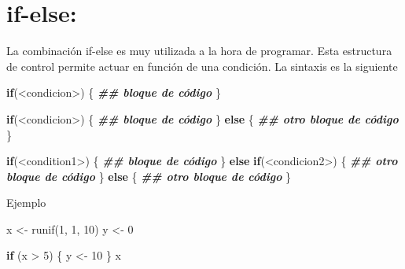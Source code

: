 \documentclass[
  12pt,
]{book}
\newenvironment{Shaded}{\begin{snugshade}}{\end{snugshade}}
\newcommand{\ControlFlowTok}[1]{\textcolor[rgb]{0.13,0.29,0.53}{\textbf{#1}}}
\newcommand{\DecValTok}[1]{\textcolor[rgb]{0.00,0.00,0.81}{#1}}
\newcommand{\DocumentationTok}[1]{\textcolor[rgb]{0.56,0.35,0.01}{\textbf{\textit{#1}}}}
\newcommand{\FunctionTok}[1]{\textcolor[rgb]{0.00,0.00,0.00}{#1}}
\newcommand{\NormalTok}[1]{#1}
\newcommand{\OtherTok}[1]{\textcolor[rgb]{0.56,0.35,0.01}{#1}}
\newcommand{\SpecialCharTok}[1]{\textcolor[rgb]{0.00,0.00,0.00}{#1}}
\begin{document}
\hypertarget{if-else}{%
\section{\texorpdfstring{\textbf{if-else}:}{if-else:}}\label{if-else}}

La combinación if-else es muy utilizada a la hora de programar. Esta estructura de control permite actuar en función de una condición.
La sintaxis es la siguiente

\begin{Shaded}
\begin{Highlighting}[]
\ControlFlowTok{if}\NormalTok{(}\SpecialCharTok{\textless{}}\NormalTok{condicion}\SpecialCharTok{\textgreater{}}\NormalTok{) \{}
  \DocumentationTok{\#\# bloque de código}
\NormalTok{\}}
\end{Highlighting}
\end{Shaded}

\begin{Shaded}
\begin{Highlighting}[]
\ControlFlowTok{if}\NormalTok{(}\SpecialCharTok{\textless{}}\NormalTok{condicion}\SpecialCharTok{\textgreater{}}\NormalTok{) \{}
  \DocumentationTok{\#\# bloque de código}
\NormalTok{\} }\ControlFlowTok{else}\NormalTok{ \{}
  \DocumentationTok{\#\# otro bloque de código}
\NormalTok{\}}
\end{Highlighting}
\end{Shaded}

\begin{Shaded}
\begin{Highlighting}[]
\ControlFlowTok{if}\NormalTok{(}\SpecialCharTok{\textless{}}\NormalTok{condition1}\SpecialCharTok{\textgreater{}}\NormalTok{) \{}
  \DocumentationTok{\#\# bloque de código}
\NormalTok{\} }\ControlFlowTok{else} \ControlFlowTok{if}\NormalTok{(}\SpecialCharTok{\textless{}}\NormalTok{condicion2}\SpecialCharTok{\textgreater{}}\NormalTok{) \{}
  \DocumentationTok{\#\# otro bloque de código}
\NormalTok{\} }\ControlFlowTok{else}\NormalTok{ \{}
  \DocumentationTok{\#\# otro bloque de código}
\NormalTok{\}}
\end{Highlighting}
\end{Shaded}

Ejemplo

\begin{Shaded}
\begin{Highlighting}[]
\NormalTok{x }\OtherTok{\textless{}{-}} \FunctionTok{runif}\NormalTok{(}\DecValTok{1}\NormalTok{, }\DecValTok{1}\NormalTok{, }\DecValTok{10}\NormalTok{)}
\NormalTok{y }\OtherTok{\textless{}{-}} \DecValTok{0}

\ControlFlowTok{if}\NormalTok{ (x }\SpecialCharTok{\textgreater{}} \DecValTok{5}\NormalTok{) \{}
\NormalTok{  y }\OtherTok{\textless{}{-}} \DecValTok{10}
\NormalTok{\}}
\NormalTok{x}
\end{Highlighting}
\end{Shaded}
\end{document}
